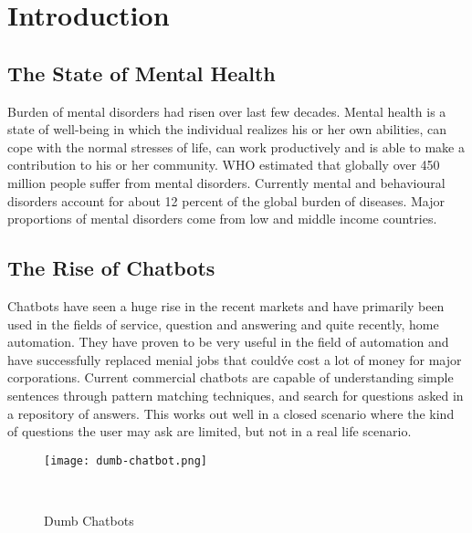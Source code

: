 \chapter{Introduction}


\section{The State of Mental Health}

Burden of mental disorders had risen over last few decades. Mental health is a state of well-being in which the individual realizes his or her own abilities, can cope with the normal stresses of life, can work productively and is able to make a contribution to his or her community. WHO estimated that globally over 450 million people suffer from mental disorders. Currently mental and behavioural disorders account for about 12 percent of the global burden of diseases. Major proportions of mental disorders come from low and middle income countries.


\section{The Rise of Chatbots}

Chatbots have seen a huge rise in the recent markets and have primarily been used in the fields of service, question and answering and quite recently, home automation. They have proven to be very useful in the field of automation and have successfully replaced menial jobs that could\'ve cost a lot of money for major corporations. Current commercial chatbots are capable of understanding simple sentences through pattern matching techniques, and search for questions asked in a repository of answers. This works out well in a closed scenario where the kind of questions the user may ask are limited, but not in a real life scenario.

\begin{figure}[H]
    \centering
    \texttt{[image: dumb-chatbot.png]}
    \caption{Dumb Chatbots}~\label{fig:dumb-chatbot}
\end{figure}